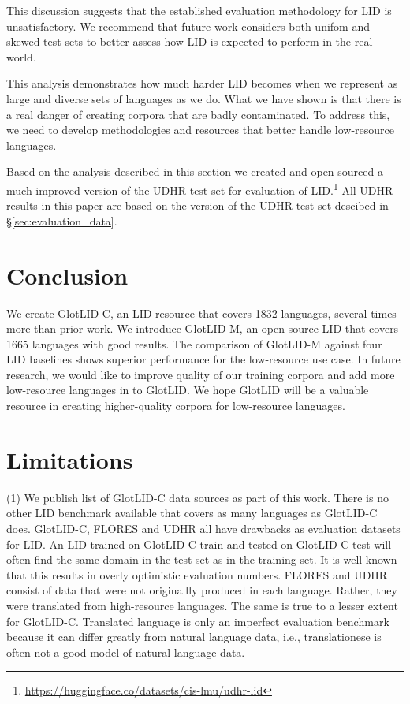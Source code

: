 \documentclass[11pt]{article}
\def\numberlanguagesaccurate{1665\xspace}
\def\numberlanguagestotal{1832\xspace}
\def\modelname{\mbox{GlotLID-M}\xspace}
\def\corpusname{\mbox{GlotLID-C}\xspace}
\def\genericname{\mbox{GlotLID}\xspace}
\def\flores{FLORES\xspace}
\def\udhr{UDHR\xspace}
\def\secref#1{\S\ref{sec:#1}}
\begin{document}
This discussion suggests that the established evaluation
methodology for LID is unsatisfactory. We recommend that
future work considers both unifom and skewed test sets to
better assess how LID is expected to perform in the real world.

This analysis  demonstrates
how much harder LID becomes
when we represent as large and diverse sets of languages as we do. What
we have shown is that there is a real danger of creating
corpora that are badly contaminated.
To address this, we
need to develop methodologies and resources that better handle
low-resource languages.


Based on the analysis described in this section we created
and open-sourced a much improved version of the UDHR test
set for evaluation of
LID.\footnote{\url{https://huggingface.co/datasets/cis-lmu/udhr-lid}}
All UDHR results in this paper are based on the version of
the UDHR test set descibed in \secref{evaluation_data}.



\section{Conclusion}
We create \corpusname, an  LID resource that
covers \numberlanguagestotal languages, several times more than prior
work.
We introduce \modelname, an open-source LID that
covers \numberlanguagesaccurate languages with good results.
The comparison of \modelname
against four  LID baselines shows
superior performance
for the low-resource use case. 
In future research, we would like to improve quality of our training corpora and add more low-resource languages in to \genericname.
We hope \genericname will
be a valuable
resource in creating higher-quality corpora for low-resource languages.

\newpage

\section*{Limitations}

(1) We publish list of \corpusname data sources 
as part of this work. There is no other LID benchmark available that
covers as many languages as \corpusname does. \corpusname,
\flores and \udhr all have drawbacks as evaluation datasets
for LID. An LID trained on \corpusname train and tested
on \corpusname test will often find the same domain in the
test set as in the training set. It is well known that this
results in overly optimistic evaluation numbers.
\flores and \udhr consist of data that were not originallly
produced in each language.
Rather, they were translated from
high-resource languages.
The same is true to a lesser extent for \corpusname.
Translated language is only an
imperfect evaluation benchmark because it can differ greatly
from natural language data, i.e., translationese is
often not a good model of  natural language data.
\end{document}
